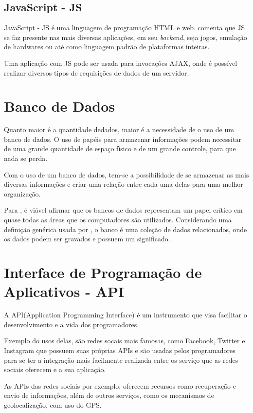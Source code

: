 \subsection{JavaScript - JS}
JavaScript - JS é uma linguagem de programação HTML e web. \cite{balduino2014} comenta que JS se faz presente nas mais diversas aplicações, em seu \textit{backend}, seja jogos, emulação de hardwares ou até como linguagem padrão de plataformas inteiras.

Uma aplicação com JS pode ser usada para invocações AJAX, onde é possível realizar diversos tipos de requisições de dados de um servidor.

\section{Banco de Dados}
Quanto maior é a quantidade dedados, maior é a necessidade de o uso de um banco de dados. O uso de papéis para armazenar informações podem necessitar de uma grande quantidade de espaço físico e de um grande controle, para que nada se perda.

Com o uso de um banco de dados, tem-se a possibilidade de se armazenar as mais diversas informações e criar uma relação entre cada uma delas para uma melhor organização.

Para \cite{elmasri2005}, é viável afirmar que os bancos de dados representam um papel crítico em quase todas as áreas que os computadores são utilizados. Considerando uma definição genérica usada por \cite{elmasri2005}, o banco é uma coleção de dados relacionados, onde os dados podem ser gravados e possuem um significado.

\section{Interface de Programação de Aplicativos - API}
A API(Application Programming Interface) é um instrumento que visa facilitar o desenvolvimento e a vida dos programadores. 

Exemplo do usos delas, são redes socais mais famosas, como Facebook, Twitter e Instagram que possuem suas próprias APIs e são usadas pelos programadores para se ter a integração mais facilmente realizada entre os serviço que as redes sociais oferecem e a sua aplicação.

As APIs das redes sociais por exemplo, oferecem recursos como recuperação e envio de informações, além de outros serviços, como os mecanismos de geolocalização, com uso do GPS.

